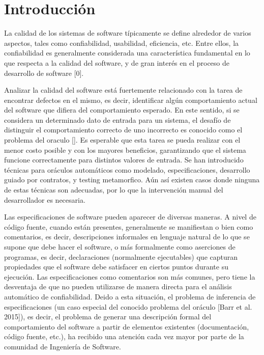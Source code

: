 \chapter{Introducción}

La calidad de los sistemas de software típicamente se define alrededor de varios aspectos, tales como confiabilidad, usabilidad, eficiencia, etc. Entre ellos, la confiabilidad es generalmente considerada una característica fundamental en lo que respecta a la calidad del software, y de gran interés en el proceso de desarrollo de software [0]. 

Analizar la calidad del software está fuertemente relacionado con la tarea de encontrar defectos en el mismo, es decir, identificar algún comportamiento actual del software que difiera del comportamiento esperado. En este sentido, si se considera un determinado dato de entrada para un sistema, el desafío de distinguir el comportamiento correcto de uno incorrecto es conocido como el problema del oraculo []. Es esperable que esta tarea se pueda realizar con el menor costo posible y con los mayores beneficios, garantizando que el sistema funcione correctamente para distintos valores de entrada. 
Se han introducido técnicas para oráculos automáticos como modelado, especificaciones, desarrollo guiado por contratos, y testing metamorfico. Aún así existen casos donde ninguna de estas técnicas son adecuadas, por lo que la intervención manual del desarrollador es necesaria.

Las especificaciones de software pueden aparecer de diversas maneras. A nivel de código fuente, cuando están presentes, generalmente se manifiestan o bien como comentarios, es decir, descripciones informales en lenguaje natural de lo que se supone que debe hacer el software, o más formalmente como aserciones de programas, es decir, declaraciones (normalmente ejecutables) que capturan propiedades que el software debe satisfacer en ciertos puntos durante su ejecución. Las especificaciones como comentarios son más comunes, pero tiene la desventaja de que no pueden utilizarse de manera directa para el análisis automático de confiabilidad. 
Deido a esta situación, el problema de inferencia de especificaciones (un caso especial del conocido problema del oráculo [Barr et al. 2015]), es decir, el problema de generar una descripción formal del comportamiento del software a partir de elementos existentes (documentación, código fuente, etc.), ha recibido una atención cada vez mayor por parte de la comunidad de Ingeniería de Software.

